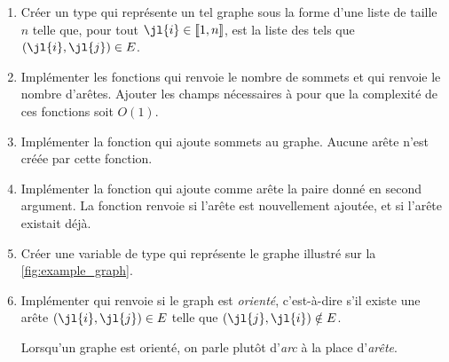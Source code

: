 \documentclass{article}
\newcommand{\llbra}{\left\llbracket}
\newcommand{\rrbra}{\right\rrbracket}
\renewcommand{\brack}[1]{\ensuremath{\llbra#1\rrbra}}
\begin{document}
\begin{enumerate}
	\item Créer un type  qui représente un tel graphe sous la forme d'une liste  de taille $n$ telle que, pour tout $\jl{i}\in\brack{1,n}$,  est la liste des  tels que $(\jl{i},\jl{j})\in E$.
	
	\item Implémenter les fonctions  qui renvoie le nombre de sommets et  qui renvoie le nombre d'arêtes. Ajouter les champs nécessaires à  pour que la complexité de ces fonctions soit $O(1)$.
	
	\item Implémenter la fonction  qui ajoute  sommets au graphe. Aucune arête n'est créée par cette fonction.

	\item Implémenter la fonction  qui ajoute comme arête la paire  donné en second argument. La fonction renvoie  si l'arête est nouvellement ajoutée, et  si l'arête existait déjà.



	\item Créer une variable  de type  qui représente le graphe illustré sur la \autoref{fig:example_graph}.

	\item Implémenter  qui renvoie  si le graph est \emph{orienté}, c'est-à-dire s'il existe une arête $(\jl{i},\jl{j})\in E$ telle que $(\jl{j},\jl{i})\notin E$.

	Lorsqu'un graphe est orienté, on parle plutôt d'\emph{arc} à la place d'\emph{arête}.
\end{enumerate}
\end{document}
